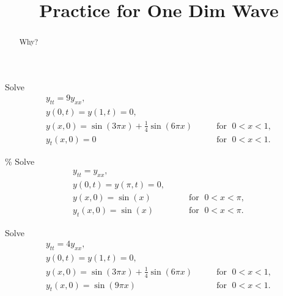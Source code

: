 \documentclass{ximera}
\title{Practice for One Dim Wave}
\begin{document}
\begin{abstract}
Why?
\end{abstract}
\maketitle

\begin{exercise}
    Solve
    \begin{equation*}
        \begin{array}{ll}
            y_{tt} = 9 y_{xx} , &  \\
            y(0,t) = y(1,t) = 0 , &  \\
            y(x,0) = \sin (3\pi x) + \frac{1}{4} \sin (6 \pi x) & \qquad \text{for } \; 0 < x < 1 , \\
            y_t(x,0) = 0 & \qquad \text{for } \; 0 < x < 1 .
        \end{array}
    \end{equation*}
\end{exercise}

\begin{exercise}\%
    Solve
    \begin{equation*}
        \begin{array}{ll}
            y_{tt} = y_{xx} , &  \\
            y(0,t) = y(\pi,t) = 0 , &  \\
            y(x,0) = \sin(x) & \qquad \text{for } \; 0 < x < \pi , \\
            y_t(x,0) = \sin(x) & \qquad \text{for } \; 0 < x < \pi .
        \end{array}
    \end{equation*}
\end{exercise}

\begin{exercise}
    Solve
    \begin{equation*}
    \begin{array}{ll}
        y_{tt} = 4 y_{xx} , &  \\
        y(0,t) = y(1,t) = 0 , &  \\
        y(x,0) = \sin (3\pi x) + \frac{1}{4} \sin (6 \pi x) & \qquad \text{for } \; 0 < x < 1 , \\
        y_t(x,0) = \sin (9 \pi x) & \qquad \text{for } \; 0 < x < 1 .
    \end{array}
    \end{equation*}
\end{exercise}
\end{document}
